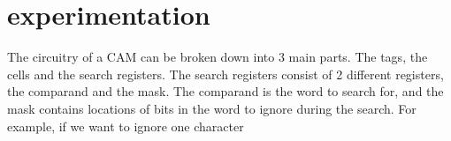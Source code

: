 \section{experimentation}
The circuitry of a CAM can be broken down into 3 main parts. The tags, the cells and the search registers. 
The search registers consist of 2 different registers, the comparand and the mask. 
The comparand is the word to search for, and the mask contains locations of bits in the word to ignore during the search.
For example, if we want to ignore one character